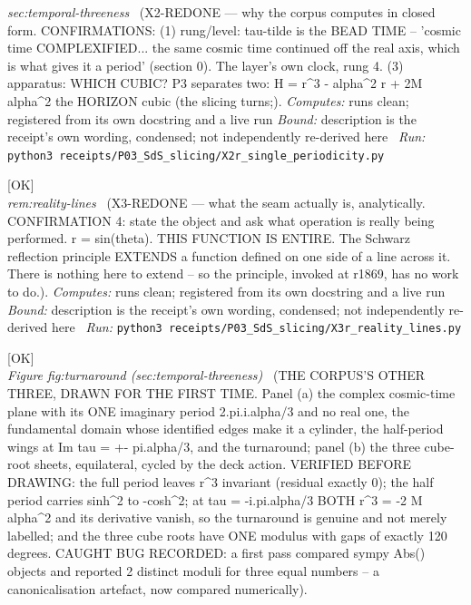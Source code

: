 \begin{description}
\textit{sec:temporal-threeness} \ (X2-REDONE --- why the corpus computes in closed form. CONFIRMATIONS: (1) rung/level: tau-tilde is the BEAD TIME -- 'cosmic time COMPLEXIFIED... the same cosmic time continued off the real axis, which is what gives it a period' (section 0). The layer's own clock, rung 4. (3) apparatus: WHICH CUBIC? P3 separates two: H = r\textasciicircum{}3 - alpha\textasciicircum{}2 r + 2M alpha\textasciicircum{}2 the HORIZON cubic (the slicing turns;). 
\emph{Computes:} runs clean; registered from its own docstring and a live run
 \emph{Bound:} description is the receipt's own wording, condensed; not independently re-derived here
\ \emph{Run:} \texttt{python3 receipts/P03\_SdS\_slicing/X2r\_single\_periodicity.py}
\item[\rcptlabel{X3r_reality_lines}{P3R34}\textbf{P3R34}\quad\texttt{X3r\_reality\_lines}]\hfill\textsf{[OK]}\\
\textit{rem:reality-lines} \ (X3-REDONE --- what the seam actually is, analytically. CONFIRMATION 4: state the object and ask what operation is really being performed. r = sin(theta). THIS FUNCTION IS ENTIRE. The Schwarz reflection principle EXTENDS a function defined on one side of a line across it. There is nothing here to extend -- so the principle, invoked at r1869, has no work to do.). 
\emph{Computes:} runs clean; registered from its own docstring and a live run
 \emph{Bound:} description is the receipt's own wording, condensed; not independently re-derived here
\ \emph{Run:} \texttt{python3 receipts/P03\_SdS\_slicing/X3r\_reality\_lines.py}
\item[\rcptlabel{P03_the_turnaround_figure}{P3R42}\textbf{P3R42}\quad\texttt{P03\_the\_turnaround\_figure}]\hfill\textsf{[OK]}\\
\textit{Figure fig:turnaround (sec:temporal-threeness)} \ (THE CORPUS'S OTHER THREE, DRAWN FOR THE FIRST TIME. Panel (a) the complex cosmic-time plane with its ONE imaginary period 2.pi.i.alpha/3 and no real one, the fundamental domain whose identified edges make it a cylinder, the half-period wings at Im tau = +- pi.alpha/3, and the turnaround; panel (b) the three cube-root sheets, equilateral, cycled by the deck action. VERIFIED BEFORE DRAWING: the full period leaves r\textasciicircum{}3 invariant (residual exactly 0); the half period carries sinh\textasciicircum{}2 to -cosh\textasciicircum{}2; at tau = -i.pi.alpha/3 BOTH r\textasciicircum{}3 = -2 M alpha\textasciicircum{}2 and its derivative vanish, so the turnaround is genuine and not merely labelled; and the three cube roots have ONE modulus with gaps of exactly 120 degrees. CAUGHT BUG RECORDED: a first pass compared sympy Abs() objects and reported 2 distinct moduli for three equal numbers -- a canonicalisation artefact, now compared numerically). 

\end{description}
